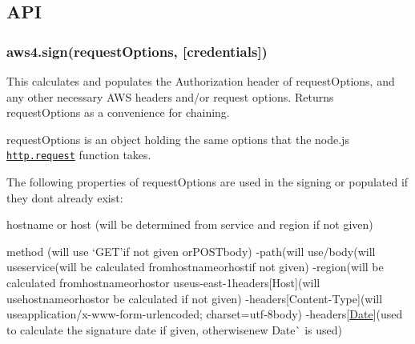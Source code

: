 \subsection*{A\+PI }

\subsubsection*{aws4.\+sign(request\+Options, \mbox{[}credentials\mbox{]})}

This calculates and populates the {\ttfamily Authorization} header of {\ttfamily request\+Options}, and any other necessary A\+WS headers and/or request options. Returns {\ttfamily request\+Options} as a convenience for chaining.

{\ttfamily request\+Options} is an object holding the same options that the node.\+js \href{http://nodejs.org/docs/latest/api/http.html#http_http_request_options_callback}{\tt http.\+request} function takes.

The following properties of {\ttfamily request\+Options} are used in the signing or populated if they don\textquotesingle{}t already exist\+:


\begin{DoxyItemize}
\item {\ttfamily hostname} or {\ttfamily host} (will be determined from {\ttfamily service} and {\ttfamily region} if not given)
\item {\ttfamily method} (will use `\textquotesingle{}G\+ET'{\ttfamily if not given or}\textquotesingle{}P\+O\+STbody{\ttfamily ) -\/}path{\ttfamily (will use}\textquotesingle{}/body{\ttfamily (will use}\textquotesingle{}service{\ttfamily (will be calculated from}hostname{\ttfamily or}host{\ttfamily if not given) -\/}region{\ttfamily (will be calculated from}hostname{\ttfamily or}host{\ttfamily or use}\textquotesingle{}us-\/east-\/1headers\mbox{[}\textquotesingle{}Host\textquotesingle{}\mbox{]}{\ttfamily (will use}hostname{\ttfamily or}host{\ttfamily or be calculated if not given) -\/}headers\mbox{[}\textquotesingle{}Content-\/\+Type\textquotesingle{}\mbox{]}{\ttfamily (will use}\textquotesingle{}application/x-\/www-\/form-\/urlencoded; charset=utf-\/8body{\ttfamily ) -\/}headers\mbox{[}\textquotesingle{}\mbox{\hyperlink{classDate}{Date}}\textquotesingle{}\mbox{]}{\ttfamily (used to calculate the signature date if given, otherwise}new Date\`{} is used)
\end{DoxyItemize}

